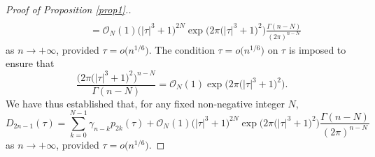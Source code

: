 \documentclass[11pt]{article}
\numberwithin{equation}{section}
\numberwithin{equation}{section}
\begin{document}
\begin{proof}[Proof of Proposition \ref{prop1}.]
\begin{align*}
\\ &\qquad = \mathcal{O}_N (1)\bigl(\left| \tau \right|^3 + 1\bigr)^{2N} \exp \big( 2\pi \bigl(\left| \tau \right|^3 + 1\bigr)^2 \big)\frac{\Gamma(n - N)}{(2\pi )^{n - N} }
\end{align*}
as $n\to+\infty$, provided $\tau = o\big(n^{1/6}\big)$. The condition $\tau = o\big(n^{1/6}\big)$ on $\tau$ is imposed to ensure that
\[
\frac{\big(2\pi \bigl(\left| \tau \right|^3 + 1\bigr)^2 \big)^{n - N} }{\Gamma(n - N)} = \mathcal{O}_N (1) \exp \big( 2\pi \bigl(\left| \tau \right|^3 + 1\bigr)^2 \big).
\]
We have thus established that, for any fixed non-negative integer $N$,
\begin{equation}\label{eq5}
D_{2n - 1} (\tau ) = \sum_{k = 0}^{N - 1}\gamma _{n - k} p_{2k} (\tau ) + \mathcal{O}_N (1)\bigl(\left| \tau \right|^3 + 1\bigr)^{2N} \exp \big( 2\pi \bigl(\left| \tau \right|^3 + 1\bigr)^2 \big)\frac{\Gamma(n - N)}{(2\pi )^{n - N} }
\end{equation}
as $n\to+\infty$, provided $\tau = o\big(n^{1/6}\big)$.


\end{proof}
\end{document}
